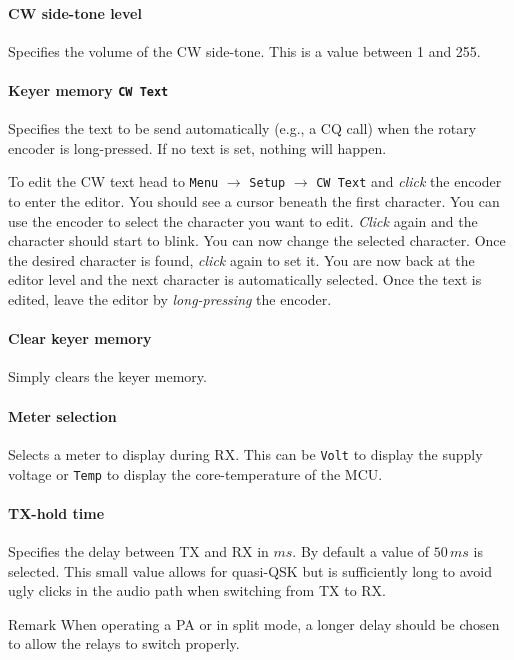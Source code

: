\documentclass[10pt, a4paper,twoside]{scrartcl}
\newenvironment{remark}{\begin{bclogo}[couleur=blue!30,arrondi=.1,logo=\bcinfo,ombre=true]{Remark}}{\end{bclogo}}
\begin{document}
\paragraph{CW side-tone level}
Specifies the volume of the CW side-tone. This is a value between 1 and 255.

\paragraph{Keyer memory \texttt{CW Text}}
Specifies the text to be send automatically (e.g., a CQ call) when the rotary encoder is long-pressed. If no text is set, nothing will happen.

To edit the CW text head to \texttt{Menu} $\rightarrow$ \texttt{Setup} $\rightarrow$ \texttt{CW Text} and \emph{click} the encoder to enter the editor. You should see a cursor beneath the first character. You can use the encoder to select the character you want to edit. \emph{Click} again and the character should start to blink. You can now change the selected character. Once the desired character is found, \emph{click} again to set it. You are now back at the editor level and the next character is automatically selected. Once the text is edited, leave the editor by \emph{long-pressing} the encoder.

\paragraph{Clear keyer memory}
Simply clears the keyer memory.

\paragraph{Meter selection}
Selects a meter to display during RX. This can be \texttt{Volt} to display the supply voltage or \texttt{Temp} to display the core-temperature of the MCU.

\paragraph{TX-hold time}
Specifies the delay between TX and RX in $ms$. By default a value of $50\,ms$ is selected. This small value allows for quasi-QSK but is sufficiently long to avoid ugly clicks in the audio path when switching from TX to RX.
\begin{remark}
When operating a PA or in split mode, a longer delay should be chosen to allow the relays to switch properly.
\end{remark}
\end{document}
